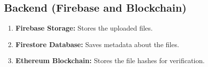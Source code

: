 \documentclass[12pt,a4paper]{report}
\begin{document}
   
   
   

\subsection{Backend (Firebase and Blockchain)}
\begin{enumerate}
   \item \textbf{Firebase Storage:} Stores the uploaded files.
   \item \textbf{Firestore Database:} Saves metadata about the files.
   \item \textbf{Ethereum Blockchain:} Stores the file hashes for verification.
\end{enumerate}
\end{document}
